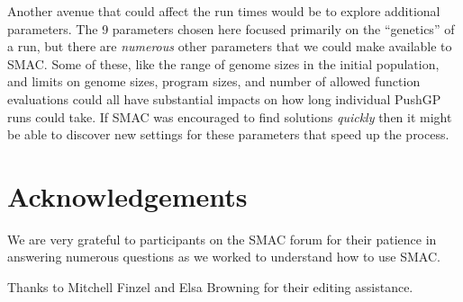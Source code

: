 Another avenue that could affect the run times would be to explore
additional parameters. The 9 parameters chosen here focused primarily
on the ``genetics'' of a run, but there are \emph{numerous} other parameters
that we could make available to SMAC. Some of these, like the range of
genome sizes in the initial population, and limits on genome sizes, program
sizes, and number of allowed function evaluations could all have substantial
impacts on how long individual PushGP runs could take. If SMAC was encouraged
to find solutions \emph{quickly} then it might be able to discover new
settings for these parameters that speed up the process.

\section*{Acknowledgements}
\label{sec:acknowledgements}

We are very grateful to participants on the SMAC forum for their patience
in answering numerous questions as we worked to understand how to use
SMAC.

Thanks to Mitchell Finzel and Elsa Browning for their editing assistance.